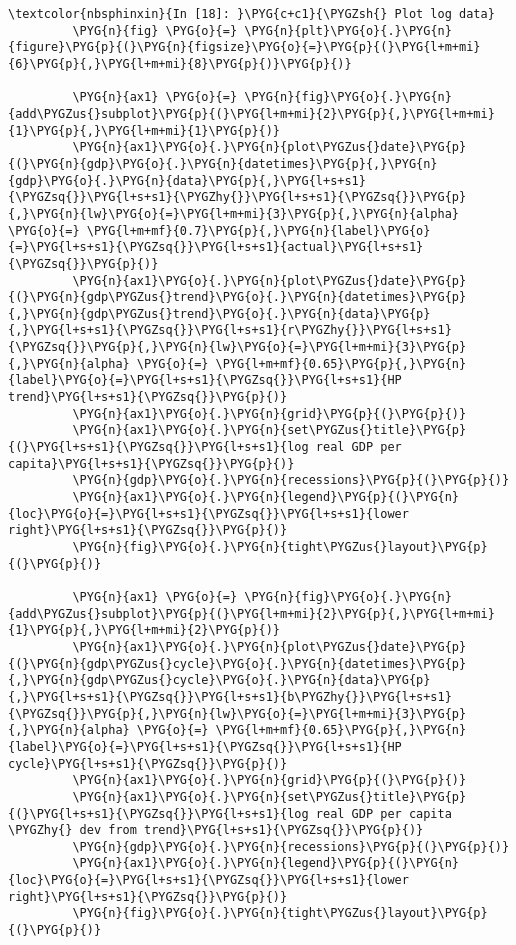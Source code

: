 \documentclass[letterpaper,10pt,openany,oneside,english]{sphinxmanual}
\begin{document}
\begin{Verbatim}[commandchars=\\\{\}]
\textcolor{nbsphinxin}{In [18]: }\PYG{c+c1}{\PYGZsh{} Plot log data}
         \PYG{n}{fig} \PYG{o}{=} \PYG{n}{plt}\PYG{o}{.}\PYG{n}{figure}\PYG{p}{(}\PYG{n}{figsize}\PYG{o}{=}\PYG{p}{(}\PYG{l+m+mi}{6}\PYG{p}{,}\PYG{l+m+mi}{8}\PYG{p}{)}\PYG{p}{)}
         
         \PYG{n}{ax1} \PYG{o}{=} \PYG{n}{fig}\PYG{o}{.}\PYG{n}{add\PYGZus{}subplot}\PYG{p}{(}\PYG{l+m+mi}{2}\PYG{p}{,}\PYG{l+m+mi}{1}\PYG{p}{,}\PYG{l+m+mi}{1}\PYG{p}{)}
         \PYG{n}{ax1}\PYG{o}{.}\PYG{n}{plot\PYGZus{}date}\PYG{p}{(}\PYG{n}{gdp}\PYG{o}{.}\PYG{n}{datetimes}\PYG{p}{,}\PYG{n}{gdp}\PYG{o}{.}\PYG{n}{data}\PYG{p}{,}\PYG{l+s+s1}{\PYGZsq{}}\PYG{l+s+s1}{\PYGZhy{}}\PYG{l+s+s1}{\PYGZsq{}}\PYG{p}{,}\PYG{n}{lw}\PYG{o}{=}\PYG{l+m+mi}{3}\PYG{p}{,}\PYG{n}{alpha} \PYG{o}{=} \PYG{l+m+mf}{0.7}\PYG{p}{,}\PYG{n}{label}\PYG{o}{=}\PYG{l+s+s1}{\PYGZsq{}}\PYG{l+s+s1}{actual}\PYG{l+s+s1}{\PYGZsq{}}\PYG{p}{)}
         \PYG{n}{ax1}\PYG{o}{.}\PYG{n}{plot\PYGZus{}date}\PYG{p}{(}\PYG{n}{gdp\PYGZus{}trend}\PYG{o}{.}\PYG{n}{datetimes}\PYG{p}{,}\PYG{n}{gdp\PYGZus{}trend}\PYG{o}{.}\PYG{n}{data}\PYG{p}{,}\PYG{l+s+s1}{\PYGZsq{}}\PYG{l+s+s1}{r\PYGZhy{}}\PYG{l+s+s1}{\PYGZsq{}}\PYG{p}{,}\PYG{n}{lw}\PYG{o}{=}\PYG{l+m+mi}{3}\PYG{p}{,}\PYG{n}{alpha} \PYG{o}{=} \PYG{l+m+mf}{0.65}\PYG{p}{,}\PYG{n}{label}\PYG{o}{=}\PYG{l+s+s1}{\PYGZsq{}}\PYG{l+s+s1}{HP trend}\PYG{l+s+s1}{\PYGZsq{}}\PYG{p}{)}
         \PYG{n}{ax1}\PYG{o}{.}\PYG{n}{grid}\PYG{p}{(}\PYG{p}{)}
         \PYG{n}{ax1}\PYG{o}{.}\PYG{n}{set\PYGZus{}title}\PYG{p}{(}\PYG{l+s+s1}{\PYGZsq{}}\PYG{l+s+s1}{log real GDP per capita}\PYG{l+s+s1}{\PYGZsq{}}\PYG{p}{)}
         \PYG{n}{gdp}\PYG{o}{.}\PYG{n}{recessions}\PYG{p}{(}\PYG{p}{)}
         \PYG{n}{ax1}\PYG{o}{.}\PYG{n}{legend}\PYG{p}{(}\PYG{n}{loc}\PYG{o}{=}\PYG{l+s+s1}{\PYGZsq{}}\PYG{l+s+s1}{lower right}\PYG{l+s+s1}{\PYGZsq{}}\PYG{p}{)}
         \PYG{n}{fig}\PYG{o}{.}\PYG{n}{tight\PYGZus{}layout}\PYG{p}{(}\PYG{p}{)}
         
         \PYG{n}{ax1} \PYG{o}{=} \PYG{n}{fig}\PYG{o}{.}\PYG{n}{add\PYGZus{}subplot}\PYG{p}{(}\PYG{l+m+mi}{2}\PYG{p}{,}\PYG{l+m+mi}{1}\PYG{p}{,}\PYG{l+m+mi}{2}\PYG{p}{)}
         \PYG{n}{ax1}\PYG{o}{.}\PYG{n}{plot\PYGZus{}date}\PYG{p}{(}\PYG{n}{gdp\PYGZus{}cycle}\PYG{o}{.}\PYG{n}{datetimes}\PYG{p}{,}\PYG{n}{gdp\PYGZus{}cycle}\PYG{o}{.}\PYG{n}{data}\PYG{p}{,}\PYG{l+s+s1}{\PYGZsq{}}\PYG{l+s+s1}{b\PYGZhy{}}\PYG{l+s+s1}{\PYGZsq{}}\PYG{p}{,}\PYG{n}{lw}\PYG{o}{=}\PYG{l+m+mi}{3}\PYG{p}{,}\PYG{n}{alpha} \PYG{o}{=} \PYG{l+m+mf}{0.65}\PYG{p}{,}\PYG{n}{label}\PYG{o}{=}\PYG{l+s+s1}{\PYGZsq{}}\PYG{l+s+s1}{HP cycle}\PYG{l+s+s1}{\PYGZsq{}}\PYG{p}{)}
         \PYG{n}{ax1}\PYG{o}{.}\PYG{n}{grid}\PYG{p}{(}\PYG{p}{)}
         \PYG{n}{ax1}\PYG{o}{.}\PYG{n}{set\PYGZus{}title}\PYG{p}{(}\PYG{l+s+s1}{\PYGZsq{}}\PYG{l+s+s1}{log real GDP per capita \PYGZhy{} dev from trend}\PYG{l+s+s1}{\PYGZsq{}}\PYG{p}{)}
         \PYG{n}{gdp}\PYG{o}{.}\PYG{n}{recessions}\PYG{p}{(}\PYG{p}{)}
         \PYG{n}{ax1}\PYG{o}{.}\PYG{n}{legend}\PYG{p}{(}\PYG{n}{loc}\PYG{o}{=}\PYG{l+s+s1}{\PYGZsq{}}\PYG{l+s+s1}{lower right}\PYG{l+s+s1}{\PYGZsq{}}\PYG{p}{)}
         \PYG{n}{fig}\PYG{o}{.}\PYG{n}{tight\PYGZus{}layout}\PYG{p}{(}\PYG{p}{)}
\end{Verbatim}
\end{document}
